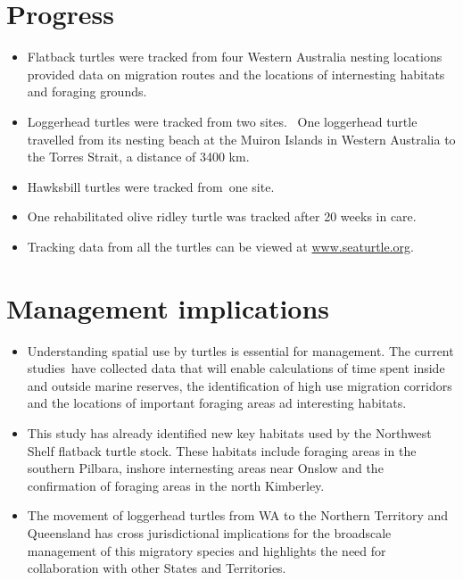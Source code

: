 \documentclass[version=last,
    paper=a4, %
    10pt, %
    usenames,
    dvipsnames,
    oneside, %
    headings=openany, %
    DIV=15 %
]{scrbook}
\begin{document}
\section*{Progress}
\begin{itemize}
\itemsep1pt\parskip0pt
\item
  Flatback turtles were tracked from four Western Australia nesting
  locations provided data on migration routes and the locations of
  internesting habitats and foraging grounds.
\item
  Loggerhead turtles were tracked from two sites.~ One loggerhead turtle
  travelled from its nesting beach at the Muiron Islands in Western
  Australia to the Torres Strait, a distance of 3400 km.
\item
  Hawksbill turtles were tracked from~one site.
\item
  One rehabilitated olive ridley turtle was tracked after 20 weeks in
  care.
\item
  Tracking data from all the turtles can be viewed at
  \href{http://www.seaturtle.org}{www.seaturtle.org}.
\end{itemize}



\section*{Management implications}
\begin{itemize}
\itemsep1pt\parskip0pt
\item
  Understanding spatial use by turtles is essential for management. The
  current studies~have collected data that will enable calculations of
  time spent inside and outside marine reserves, the identification of
  high use migration corridors and the locations of important foraging
  areas ad interesting habitats.
\item
  This study has already identified new key habitats used by the
  Northwest Shelf flatback turtle stock. These habitats include foraging
  areas in the southern Pilbara, inshore internesting areas near Onslow
  and the confirmation of foraging areas in the north Kimberley.
\item
  The movement of loggerhead turtles from WA to the Northern Territory
  and Queensland has cross jurisdictional implications for the
  broadscale management of this migratory species and highlights the
  need for collaboration with other States and Territories.
\end{itemize}
\end{document}
